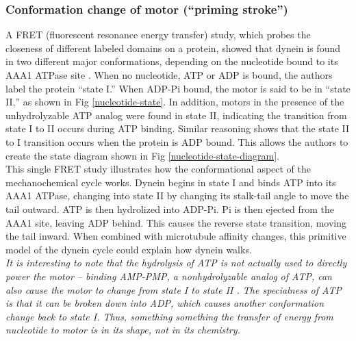 \documentclass[10pt]{article} %
\begin{document}
\subsubsection{Conformation change of motor (``priming stroke'')}
A FRET (fluorescent resonance energy transfer) study, which probes the closeness of different labeled domains on a protein, showed that dynein is found in two different major conformations, depending on the nucleotide bound to its AAA1 ATPase site \cite{FRETstatepaper}. When no nucleotide, ATP or ADP is bound, the authors label the protein ``state I.'' When ADP-Pi bound, the motor is said to be in ``state II,'' as shown in Fig \ref{nucleotide-state}. In addition, motors in the presence of the unhydrolyzable ATP analog were found in state II, indicating the transition from state I to II occurs during ATP binding. Similar reasoning shows that the state II to I transition occurs when the protein is ADP bound. This allows the authors to create the state diagram shown in Fig \ref{nucleotide-state-diagram}.\\



This single FRET study illustrates how the conformational aspect of the mechanochemical cycle works. Dynein begins in state I and binds ATP into its AAA1 ATPase, changing into state II by changing its stalk-tail angle to move the tail outward. ATP is then hydrolized into ADP-Pi. Pi is then ejected from the AAA1 site, leaving ADP behind. This causes the reverse state transition, moving the tail inward. When combined with microtubule affinity changes, this primitive model of the dynein cycle could explain how dynein walks.\\

\textit{It is interesting to note that the hydrolysis of ATP is not actually used to directly power the motor -- binding AMP-PMP, a nonhydrolyzable analog of ATP, can also cause the motor to change from state I to state II \cite{FRETstatepaper}. The specialness of ATP is that it can be broken down into ADP, which causes another conformation change back to state I. Thus, something something the transfer of energy from nucleotide to motor is in its shape, not in its chemistry.}\\
\end{document}
